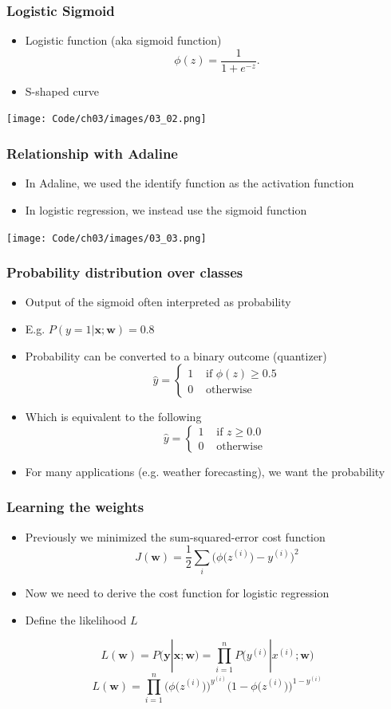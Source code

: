 \documentclass{beamer}
\begin{document}
\begin{frame}
  \frametitle{Logistic Sigmoid}
  \begin{itemize}
  \item Logistic function (aka sigmoid function)
    \[
    \phi(z) = \frac{1}{1+e^{-z}}.
    \]
  \item S-shaped curve
  \end{itemize}
  \center
  \texttt{[image: Code/ch03/images/03\_02.png]}
\end{frame}

\begin{frame}
  \frametitle{Relationship with Adaline}
  \begin{itemize}
  \item In Adaline, we used the identify function as the activation function
  \item In logistic regression, we instead use the sigmoid function
  \end{itemize}
  \texttt{[image: Code/ch03/images/03\_03.png]}
\end{frame}

\begin{frame}
  \frametitle{Probability distribution over classes}
  \begin{itemize}
  \item Output of the sigmoid often interpreted as probability
  \item E.g. $P(y=1 | \mathbf{x};\mathbf{w}) = 0.8$
  \item Probability can be converted to a binary outcome (quantizer)
  \[ \hat{y}= \begin{cases}
    1 & \text{ if } \phi(z) \ge 0.5 \\
    0 & \text{ otherwise }
    \end{cases}
  \]
\item Which is equivalent to the following
  \[ \hat{y}= \begin{cases}
    1 & \text{ if } z \ge 0.0 \\
    0 & \text{ otherwise }
    \end{cases}
  \]
  \item For many applications (e.g. weather forecasting), we want the probability
  \end{itemize}
\end{frame}

\begin{frame}
  \frametitle{Learning the weights}
  \begin{itemize}
  \item Previously we minimized the sum-squared-error cost function
    \[
    J(\mathbf{w}) = \frac{1}{2} \sum_i \bigg( \phi \big( z^{(i)} \big) - y^{(i)}  \bigg)^2
    \]
  \item Now we need to derive the cost function for logistic regression
  \item Define the likelihood $L$
  \end{itemize}
  \[
  L(\mathbf{w}) = P(\mathbf{y} | \mathbf{x}; \mathbf{w}) = \prod_{i=1}^{n} P \big( y^{(i)} | x^{(i)}; \mathbf{w} \big)
  \]
  \[
  L(\mathbf{w}) = \prod_{i=1}^{n} \bigg( \phi \big(z^{(i)} \big) \bigg) ^ {y^{(i)}} \bigg( 1 - \phi \big( z^{(i)} \big) \bigg)^{1-y^{(i)}}
  \]
\end{frame}
\end{document}
